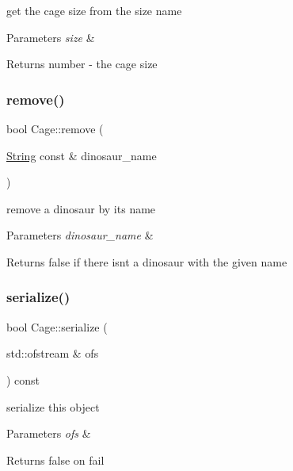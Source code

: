get the cage size from the size name 
\begin{DoxyParams}{Parameters}
{\em size} & \\
\hline
\end{DoxyParams}
\begin{DoxyReturn}{Returns}
number -\/ the cage size 
\end{DoxyReturn}
\mbox{\label{classCage_aab085c5842eea748279b9a4593b8a076}} 
\subsubsection{\texorpdfstring{remove()}{remove()}}
{\footnotesize\ttfamily bool Cage\+::remove (\begin{DoxyParamCaption}\item[{\hyperlink{classString}{String} const \&}]{dinosaur\+\_\+name }\end{DoxyParamCaption})}

remove a dinosaur by its name 
\begin{DoxyParams}{Parameters}
{\em dinosaur\+\_\+name} & \\
\hline
\end{DoxyParams}
\begin{DoxyReturn}{Returns}
false if there isn\textquotesingle{}t a dinosaur with the given name 
\end{DoxyReturn}
\mbox{\label{classCage_a1bcba33e73227c00ff1b6b5c13046f06}} 
\subsubsection{\texorpdfstring{serialize()}{serialize()}}
{\footnotesize\ttfamily bool Cage\+::serialize (\begin{DoxyParamCaption}\item[{std\+::ofstream \&}]{ofs }\end{DoxyParamCaption}) const}

serialize this object 
\begin{DoxyParams}{Parameters}
{\em ofs} & \\
\hline
\end{DoxyParams}
\begin{DoxyReturn}{Returns}
false on fail 
\end{DoxyReturn}
\mbox{\label{classCage_af59c76e3bd8c691c19fee15ce4cb5b83}} 

